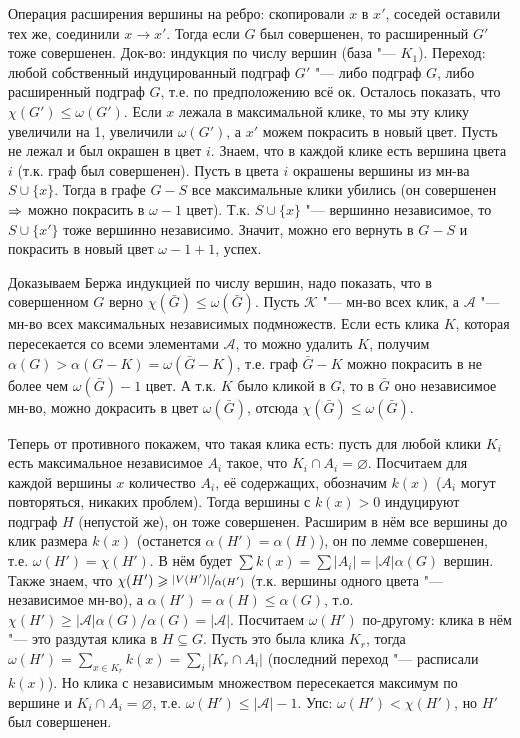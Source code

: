	Операция расширения вершины на ребро: скопировали $x$ в $x'$, соседей оставили тех же, соединили $x \to x'$.
	Тогда если $G$ был совершенен, то расширенный $G'$ тоже совершенен.
	Док-во: индукция по числу вершин (база "--- $K_1$).
	Переход: любой собственный индуцированный подграф $G'$ "--- либо подграф $G$, либо расширенный подграф $G$, т.е. по предположению всё ок.
	Осталось показать, что $\chi(G') \le \omega(G')$.
	Если $x$ лежала в максимальной клике, то мы эту клику увеличили на 1, увеличили $\omega(G')$, а $x'$ можем покрасить в новый цвет.
	Пусть не лежал и был окрашен в цвет $i$.
	Знаем, что в каждой клике есть вершина цвета $i$ (т.к. граф был совершенен).
	Пусть в цвета $i$ окрашены вершины из мн-ва $S\cup \{x\}$.
	Тогда в графе $G-S$ все максимальные клики убились (он совершенен $\Rightarrow$ можно покрасить в $\omega-1$ цвет).
	Т.к. $S \cup \{x\}$ "--- вершинно независимое, то $S \cup \{x'\}$ тоже вершинно независимо.
	Значит, можно его вернуть в $G-S$ и покрасить в новый цвет $\omega-1+1$, успех.

	Доказываем Бержа индукцией по числу вершин, надо показать, что в совершенном $G$ верно $\chi(\bar G) \le \omega(\bar G)$.
	Пусть $\mathcal{K}$ "--- мн-во всех клик, а $\mathcal{A}$ "--- мн-во всех максимальных независимых подмножеств.
	Если есть клика $K$, которая пересекается со всеми элементами $\mathcal{A}$, то можно удалить $K$,
	получим $\alpha(G)>\alpha(G-K)=\omega(\bar G - K)$, т.е. граф $\bar G - K$ можно покрасить в не более чем $\omega(\bar G)-1$ цвет.
	А т.к. $K$ было кликой в $G$, то в $\bar G$ оно независимое мн-во, можно докрасить в цвет $\omega(\bar G)$, отсюда $\chi(\bar G)\le\omega(\bar G)$.

	Теперь от противного покажем, что такая клика есть: пусть для любой клики $K_i$ есть максимальное независимое $A_i$ такое, что $K_i \cap A_i=\varnothing$.
	Посчитаем для каждой вершины $x$ количество $A_i$, её содержащих, обозначим $k(x)$ ($A_i$ могут повторяться, никаких проблем).
	Тогда вершины с $k(x)>0$ индуцируют подграф $H$ (непустой же), он тоже совершенен.
	Расширим в нём все вершины до клик размера $k(x)$ (останется $\alpha(H')=\alpha(H)$), он по лемме совершенен, т.е. $\omega(H')=\chi(H')$.
	В нём будет $\sum k(x) = \sum |A_i| = |\mathcal{A}|\alpha(G)$ вершин.
	Также знаем, что $\chi(H') \geqslant \sfrac{|V(H')|}{\alpha(H')}$ (т.к. вершины одного цвета "--- независимое мн-во), а $\alpha(H') = \alpha(H) \le \alpha(G)$, т.о.
	$\chi(H')\ge |\mathcal{A}|\alpha(G)/\alpha(G)=|\mathcal{A}|$.
	Посчитаем $\omega(H')$ по-другому: клика в нём "--- это раздутая клика в $H\subseteq G$.
	Пусть это была клика $K_r$, тогда $\omega(H')=\sum_{x \in K_r} k(x)=\sum_{i} |K_r \cap A_i|$ (последний переход "--- расписали $k(x)$).
	Но клика с независимым множеством пересекается максимум по вершине и $K_i \cap A_i=\varnothing$, т.е. $\omega(H') \le |\mathcal{A}|-1$.
	Упс: $\omega(H') < \chi(H')$, но $H'$ был совершенен.
